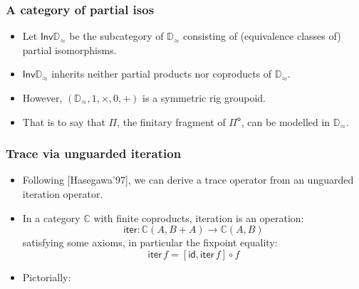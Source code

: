 \documentclass[12pt,t]{beamer}
\newcommand{\C}{\mathbb{C}}
\newcommand{\Pio}{\ensuremath{\mathsf{\Pi}^{\mathsf{o}}}}
\newcommand{\copair}[2]{[#1,#2]}
\newcommand{\Inv}{\mathsf{Inv}}
\newcommand{\iter}{\mathsf{iter}}
\newcommand{\id}{\mathsf{id}}
\newcommand{\Dapprox}{\mathbb{D}_{\approx}}
\begin{document}
\begin{frame}

  \frametitle{A category of partial isos}
  \begin{itemize}
  \item Let $\Inv \Dapprox$ be the subcategory of $\Dapprox$
    consisting of (equivalence classes of) partial isomorphisms.
  \item $\Inv\Dapprox$ inherits neither partial products nor
    coproducts of $\Dapprox$.
  \item However, $(\Dapprox,1,\times,0,+)$ is a symmetric rig
    groupoid.
  \item That is to say that $\Pi$, the finitary fragment of
    \Pio, can be modelled in $\Dapprox$.
  \end{itemize}
  
  
\end{frame}

\begin{frame}

  \frametitle{Trace via unguarded iteration}

  \begin{itemize}

  \item Following [Hasegawa'97], we can derive a trace operator from
    an unguarded iteration operator.
  \item In a category $\C$ with finite coproducts,  iteration is an operation:
    \[
    \iter : \C (A ,B + A) \to \C(A , B)
    \]
    satisfying some axioms, in particular the fixpoint equality:
    \[
    \iter\,f = \copair {\id} {\iter \,f} \circ f
    \]
  \item Pictorially:
  \end{itemize}
  
\end{frame}
\end{document}
